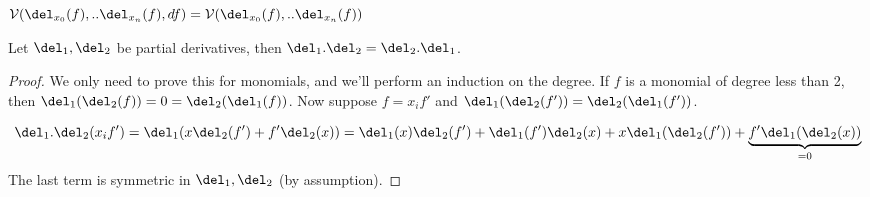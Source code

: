 \begin{corollary}
$\V(\del_{x_0}(f),..\del_{x_n}(f), df) = \V(\del_{x_0}(f),..\del_{x_n}(f))$
\end{corollary}


\begin{lemma}
Let $\del_1,\del_2$ be partial derivatives, then $\del_1.\del_2 = \del_2.\del_1$.
\end{lemma}
\begin{proof}
We only need to prove this for monomials, and we'll perform an induction on the degree.
If $f$ is a monomial of degree less than 2, then $\del_1(\del_2(f)) = 0 = \del_2(\del_1(f))$. 
Now suppose $f = x_if'$ and $\del_1(\del_2(f')) = \del_2(\del_1(f'))$.

\begin{equation}
\del_1.\del_2(x_if') = \del_1(x\del_2(f') + f'\del_2(x)) = 
\del_1(x)\del_2(f') + \del_1(f')\del_2(x) + x\del_1(\del_2(f')) + \underset{=0}{\underbrace{f'\del_1(\del_2(x))}}
\end{equation}
The last term is symmetric in $\del_1,\del_2$ (by assumption).
\end{proof}

